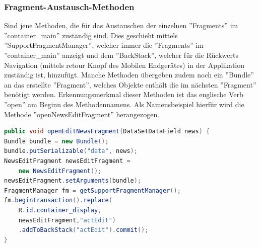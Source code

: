 \subsubsection{Fragment-Austausch-Methoden}
 Sind jene Methoden, die für das Austauschen der einzelnen ''Fragments'' im ''container\_main'' zuständig sind. Dies geschieht mittels ''SupportFragmentManager'', welcher immer die ''Fragments'' im ''container\_main'' anzeigt und dem ''BackStack'', welcher für die Rückwerts Navigation (mittels retour Knopf des Mobilen Endgerätes) in der Applikation zuständig ist,  hinzufügt. Manche Methoden übergeben zudem noch ein ''Bundle'' an das erstellte ''Fragment'', welches Objekte enthält die im nächsten ''Fragment'' benötigt werden. Erkennungsmerkmal dieser Methoden ist das englische Verb ''open'' am Beginn des Methodennamens. Als Namensbeispiel hierfür wird die Methode ''openNewsEditFragment'' herangezogen.
\begin{lstlisting}[language=Java,caption={Beispiel für Fragment-Austausch-Methode}]
public void openEditNewsFragment(DataSetDataField news) {
Bundle bundle = new Bundle();
bundle.putSerializable("data", news);
NewsEditFragment newsEditFragment =
    new NewsEditFragment();
newsEditFragment.setArguments(bundle);
FragmentManager fm = getSupportFragmentManager();
fm.beginTransaction().replace(
    R.id.container_display, 	
    newsEditFragment,"actEdit")
    .addToBackStack("actEdit").commit();
}
\end{lstlisting}
